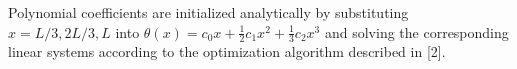 Polynomial coefficients are initialized analytically by substituting $x = L/3, 2L/3, L$ into $\theta(x) = c_0 x + \frac{1}{2} c_1 x^2 + \frac{1}{3} c_2 x^3$ and solving the corresponding linear systems according to the optimization algorithm described in [2].
